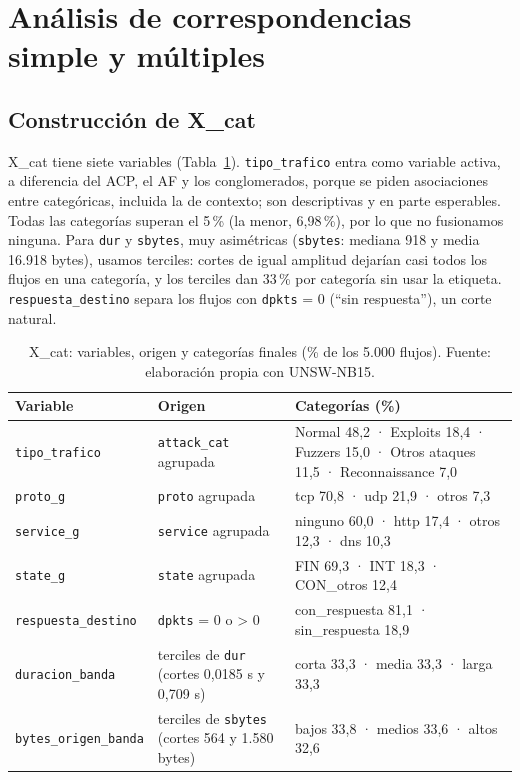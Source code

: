 \section{Análisis de correspondencias simple y múltiples}
\label{sec:acm}

\subsection{Construcción de X\_cat}
X\_cat tiene siete variables (Tabla~\ref{tab:xcat}). \texttt{tipo\_trafico} entra como variable activa, a diferencia del ACP, el AF y los conglomerados, porque se piden asociaciones entre categóricas, incluida la de contexto; son descriptivas y en parte esperables. Todas las categorías superan el 5\,\% (la menor, 6,98\,\%), por lo que no fusionamos ninguna. Para \texttt{dur} y \texttt{sbytes}, muy asimétricas (\texttt{sbytes}: mediana 918 y media 16.918 bytes), usamos terciles: cortes de igual amplitud dejarían casi todos los flujos en una categoría, y los terciles dan 33\,\% por categoría sin usar la etiqueta. \texttt{respuesta\_destino} separa los flujos con \texttt{dpkts} = 0 (``sin respuesta''), un corte natural.

\begin{table}[htbp]
  \centering
  \caption[Variables y categorías finales de X\_cat]{X\_cat: variables, origen y categorías finales (\% de los 5.000 flujos). Fuente: elaboración propia con UNSW-NB15.}\label{tab:xcat}
  \begin{tablacompacta}
  \footnotesize\setlength{\tabcolsep}{3pt}
  \begin{tabularx}{\linewidth}{@{}>{\raggedright\arraybackslash}p{3.3cm}>{\raggedright\arraybackslash}p{3.6cm}X@{}}
    \toprule
    Variable & Origen & Categorías (\%) \\
    \midrule
    \texttt{tipo\_trafico} & \texttt{attack\_cat} agrupada & Normal 48,2 · Exploits 18,4 · Fuzzers 15,0 · Otros ataques 11,5 · Reconnaissance 7,0 \\
    \texttt{proto\_g} & \texttt{proto} agrupada & tcp 70,8 · udp 21,9 · otros 7,3 \\
    \texttt{service\_g} & \texttt{service} agrupada & ninguno 60,0 · http 17,4 · otros 12,3 · dns 10,3 \\
    \texttt{state\_g} & \texttt{state} agrupada & FIN 69,3 · INT 18,3 · CON\_otros 12,4 \\
    \texttt{respuesta\_destino} & \texttt{dpkts} = 0 o > 0 & con\_respuesta 81,1 · sin\_respuesta 18,9 \\
    \texttt{duracion\_banda} & terciles de \texttt{dur} (cortes 0,0185 s y 0,709 s) & corta 33,3 · media 33,3 · larga 33,3 \\
    \texttt{bytes\_origen\_banda} & terciles de \texttt{sbytes} (cortes 564 y 1.580 bytes) & bajos 33,8 · medios 33,6 · altos 32,6 \\
    \bottomrule
  \end{tabularx}
  \end{tablacompacta}
\end{table}


